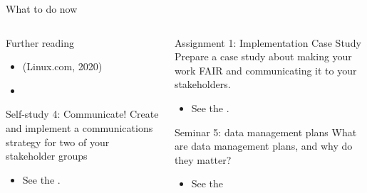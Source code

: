
\begin{frame}{What to do now}

	\begin{columns}[t]
		\begin{column}{.45\textwidth}
		
		\begin{block}{Further reading}
		\begin{itemize}
		    \item {} (Linux.com, 2020)
		    \item {}
		\end{itemize}
		\end{block}
		
		\begin{block}{Self-study 4: Communicate!}
			Create and implement a communications strategy for two of your stakeholder groups
			\begin{itemize}
			    \item See the .
			\end{itemize}
		\end{block}
		\end{column}

		\begin{column}{.45\textwidth}
		
		\begin{block}{Assignment 1: Implementation Case Study}
			Prepare a case study about making your work FAIR and communicating it to your stakeholders.
			\begin{itemize}
			    \item See the .
			\end{itemize}
		\end{block}
		
		\begin{block}{Seminar 5: data management plans}
			What are data management plans, and why do they matter?
			\begin{itemize}
				\item See the 
			\end{itemize}
		\end{block}
		\end{column}

	\end{columns}

\end{frame}

